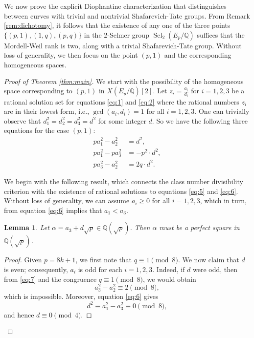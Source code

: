 \documentclass[10pt]{article}
\newtheorem{lemma}[theorem]{Lemma}
\begin{document}
We now prove the explicit Diophantine characterization that distinguishes between curves with trivial and nontrivial Shafarevich-Tate groups. From Remark \ref{rem:dichotomy}, it follows that the existence of any one of the three points \(\{(p,1), (1,q), (p,q)\}\) in the 2-Selmer group \(\operatorname{Sel}_{2}(E_{p}/\mathbb{Q})\) suffices that the Mordell-Weil rank is two, along with a trivial Shafarevich-Tate group. Without loss of generality, we then focus on the point \((p,1)\) and the corresponding homogeneous spaces.

\begin{proof}[Proof of Theorem \ref{thm:main}]
We start with the possibility of the homogeneous space corresponding to \((p,1)\) in \(X(E_{p}/\mathbb{Q})[2]\). Let \(z_{i} = \frac{a_{i}}{d_{i}}\) for \(i = 1,2,3\) be a rational solution set for equations \eqref{eq:1} and \eqref{eq:2} where the rational numbers \(z_{i}\) are in their lowest form, i.e., \(\gcd(a_{i},d_{i}) = 1\) for all \(i = 1,2,3\). One can trivially observe that \(d_{1}^{2} = d_{2}^{2} = d_{3}^{2} = d^{2}\) for some integer \(d\). So we have the following three equations for the case \((p,1)\):
\begin{align}
p a_{1}^{2} - a_{2}^{2} &= d^{2}, \tag{5}\label{eq:5}\\
p a_{1}^{2} - p a_{3}^{2} &= -p^{2} \cdot d^{2}, \tag{6}\label{eq:6}\\
p a_{3}^{2} - a_{2}^{2} &= 2q \cdot d^{2}. \tag{7}\label{eq:7}
\end{align}

We begin with the following result, which connects the class number divisibility criterion with the existence of rational solutions to equations \eqref{eq:5} and \eqref{eq:6}. Without loss of generality, we can assume \(a_{i} \geq 0\) for all \(i = 1,2,3\), which in turn, from equation \eqref{eq:6} implies that \(a_{1} < a_{3}\).

\begin{lemma}\label{lem:alpha}
Let \(\alpha = a_{3} + d\sqrt{p} \in \mathbb{Q}(\sqrt{p})\). Then \(\alpha\) must be a perfect square in \(\mathbb{Q}(\sqrt{p})\).
\end{lemma}

\begin{proof}
Given \(p = 8k + 1\), we first note that \(q \equiv 1 \pmod{8}\). We now claim that \(d\) is even; consequently, \(a_{i}\) is odd for each \(i = 1,2,3\). Indeed, if \(d\) were odd, then from \eqref{eq:7} and the congruence \(q \equiv 1 \pmod{8}\), we would obtain
\[a_{3}^{2} - a_{2}^{2} \equiv 2 \pmod{8},\]
which is impossible. Moreover, equation \eqref{eq:6} gives
\[d^{2} \equiv a_{1}^{2} - a_{3}^{2} \equiv 0 \pmod{8},\]
and hence \(d \equiv 0 \pmod{4}\).


\end{proof}
\end{proof}
\end{document}
